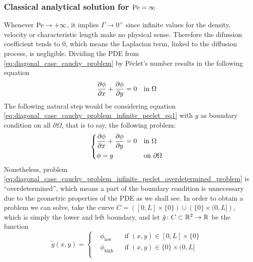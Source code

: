\subsubsection{Classical analytical solution for \texorpdfstring{$\mathrm{Pe} =
\infty$}{infinite Péclet's number}}

Whenever $\mathrm{Pe} \to +\infty$, it implies $\Gamma \to 0^+$ since infinite
values for the density, velocity or characteristic length make no physical
sense. Therefore the difussion coefficient tends to $0$, which means the
Laplacian term, linked to the diffusion process, is negligible. Dividing the PDE
from \eqref{eq:diagonal_case_cauchy_problem} by Péclet's number results in the
following equation
\begin{equation} \label{eq:diagonal_case_cauchy_problem_infinite_peclet_eq1}
	\pdv{\phi}{x} + \pdv{\phi}{y} = 0 \quad \text{in } \Omega
\end{equation}
The following natural step would be considering equation
\eqref{eq:diagonal_case_cauchy_problem_infinite_peclet_eq1} with $g$ as boundary
condition on all $\partial \Omega$, that is to say, the following problem:
\begin{equation} \label{eq:diagonal_case_cauchy_problem_infinite_peclet_overdetermined_problem}
	\left\{
	\begin{aligned}
		&\pdv{\phi}{x} + \pdv{\phi}{y} = 0 &
		&\text{in } \Omega \\
		&\phi = g &
		&\text{on } \partial \Omega
	\end{aligned}
	\right.
\end{equation}
Nonetheless, problem
\eqref{eq:diagonal_case_cauchy_problem_infinite_peclet_overdetermined_problem}
is ``overdetermined'', which means a part of the boundary condition is
unnecessary due to the geometric properties of the PDE as we shall see. In order
to obtain a problem we can solve, take the curve $C = \left( [0,L] \times \{ 0
\} \right) \cup \left( \{ 0 \} \times (0,L] \right)$, which is simply the lower
and left boundary, and let $\tilde{g} \colon C \subset \mathbb{R}^2 \rightarrow
\mathbb{R}$ be the function
\begin{equation}
	\tilde{g}(x,y) = 
	\left\{
	\begin{aligned}
		&\phi_\text{low} 	& &\text{if } (x,y) \in [0,L] \times \{ 0 \} \\
		&\phi_\text{high} 	& &\text{if } (x,y) \in \{ 0 \} \times (0,L] \\
	\end{aligned}
	\right.
\end{equation}
